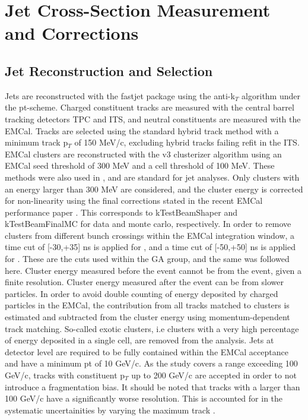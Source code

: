 \section{Jet Cross-Section Measurement and Corrections}
\label{chap:jetXsec}

\subsection{Jet Reconstruction and Selection}
\label{sec:JetRecoSel}

Jets are reconstructed with the fastjet package using the anti-k$_T$ algorithm under the pt-scheme. Charged constituent tracks are measured with the central barrel tracking detectors TPC and ITS, and neutral constituents are measured with the EMCal. Tracks are selected using the standard hybrid track method with a minimum track p$_T$ of 150 MeV/c, excluding hybrid tracks failing refit in the ITS. EMCal clusters are reconstructed with the v3 clusterizer algorithm using an EMCal seed threshold of 300 MeV and a cell threshold of 100 MeV. These methods were also used in \cite{anaNoteMFasel}, and are standard for jet analyses. Only clusters with an energy larger than 300 MeV are considered, and the cluster energy is corrected for non-linearity using the final corrections stated in the recent EMCal performance paper \cite{EMCalPerformance2022}. This corresponds to kTestBeamShaper and kTestBeamFinalMC for data and monte carlo, respectively. In order to remove clusters from different bunch crossings within the EMCal integration window, a time cut of [-30,+35] ns is applied for \pp, and a time cut of [-50,+50] ns is applied for \pPb. These are the cuts used within the GA group, and the same was followed here. Cluster energy measured before the event cannot be from the event, given a finite resolution. Cluster energy measured after the event can be from slower particles. In order to avoid double counting of energy deposited by charged particles in the EMCal, the contribution from all tracks matched to clusters is estimated and subtracted from the cluster energy using momentum-dependent track matching. So-called exotic clusters, i.e clusters with a very high percentage of energy deposited in a single cell, are removed from the analysis. Jets at detector level are required to be fully contained within the EMCal acceptance and have a minimum pt of 10 GeV/c. As the study covers a \pT range exceeding 100 GeV/c, tracks with constituent p$_T$ up to 200 GeV/c are accepted in order to not introduce a fragmentation bias. It should be noted that tracks with a \pT larger than 100 GeV/c have a significantly worse \pT resolution. This is accounted for in the systematic uncertainities by varying the maximum track \pT.

